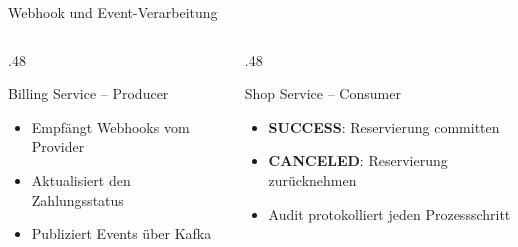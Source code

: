 \documentclass[aspectratio=169,11pt]{beamer}
\begin{document}
\begin{frame}{Webhook und Event-Verarbeitung}
    \begin{columns}[T]
        \begin{column}{.48\textwidth}
            \begin{block}{Billing Service – Producer}
                \begin{itemize}
                    \item Empfängt Webhooks vom Provider
                    \item Aktualisiert den Zahlungsstatus
                    \item Publiziert Events über Kafka
                \end{itemize}
            \end{block}
        \end{column}
        \begin{column}{.48\textwidth}
            \begin{block}{Shop Service – Consumer}
                \begin{itemize}
                    \item \textbf{SUCCESS}: Reservierung committen
                    \item \textbf{CANCELED}: Reservierung zurücknehmen
                    \item Audit protokolliert jeden Prozessschritt
                \end{itemize}
            \end{block}
        \end{column}
    \end{columns}
\end{frame}
\end{document}
